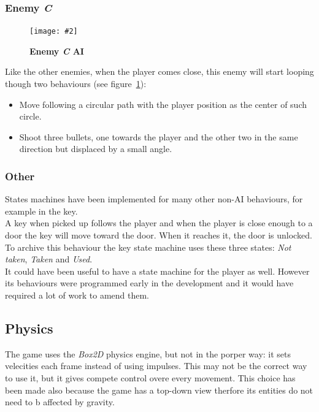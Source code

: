 \documentclass[10pt, a4paper]{article}
\newcommand{\figuremacro}[5]{
    \begin{figure}[#1]
        \centering
        \texttt{[image: \#2]}
        \caption[#3]{\textbf{#3}#4}
        \label{fig:#2}
    \end{figure}
}
\begin{document}
    \subsubsection{Enemy \textit{C}}
    \figuremacro{h}{EnemyC}{Enemy \textit{C} AI}{}{1.0}
    Like the other enemies, when the player comes close, this enemy will start looping though two behaviours (see figure~\ref{fig:EnemyC}):
    \begin{itemize}
    	\item Move following a circular path with the player position as the center of such circle.
    	\item Shoot three bullets, one towards the player and the other two in the same direction but displaced by a small angle.
    \end{itemize}
    
    \subsubsection{Other}
    States machines have been implemented for many other non-AI behaviours, for example in the key.\\
    A key when picked up follows the player and when the player is close enough to a door the key will move toward the door. When it reaches it, the door is unlocked. To archive this behaviour the key state machine uses these three states: \textit{Not taken}, \textit{Taken} and \textit{Used}.\\
    It could have been useful to have a state machine for the player as well. However its behaviours were programmed early in the development and it would have required a lot of work to amend them.
    
    \subsection{Physics}
    The game uses the \textit{Box2D} physics engine, but not in the porper way: it sets velecities each frame instead of using impulses. This may not be the correct way to use it, but it gives compete control overe every movement. This choice has been made also because the game has a top-down view therfore its entities do not need to b affected by gravity.
    
\end{document}
